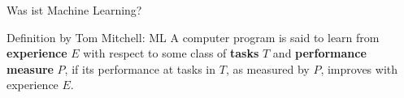 \documentclass[hyperref={pdfpagelabels=false},usepdftitle=false]{beamer}
\begin{document}

\title{\titleText}
\author{\tutor}
\date{16. Juli 2015}
\subject{Machine Learning}

\frame{\titlepage}

\begin{frame}{Was ist Machine Learning?}
    \begin{block}{Definition by Tom Mitchell: ML}
        A computer program is said to learn from \textbf{experience} $E$ with
        respect to some class of \textbf{tasks} $T$ and \textbf{performance
        measure} $P$, if its performance at tasks in $T$, as measured by $P$,
        improves with experience $E$.
    \end{block}
\end{frame}







\end{document}
